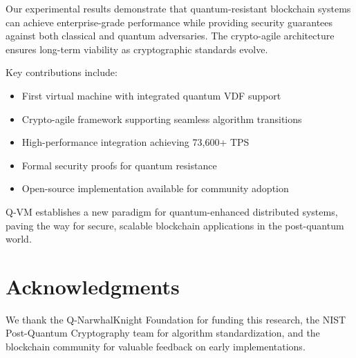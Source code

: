 \documentclass[11pt]{article}
\begin{document}
Our experimental results demonstrate that quantum-resistant blockchain systems can achieve enterprise-grade performance while providing security guarantees against both classical and quantum adversaries. The crypto-agile architecture ensures long-term viability as cryptographic standards evolve.

Key contributions include:

\begin{itemize}
    \item First virtual machine with integrated quantum VDF support
    \item Crypto-agile framework supporting seamless algorithm transitions
    \item High-performance integration achieving 73,600+ TPS
    \item Formal security proofs for quantum resistance
    \item Open-source implementation available for community adoption
\end{itemize}

Q-VM establishes a new paradigm for quantum-enhanced distributed systems, paving the way for secure, scalable blockchain applications in the post-quantum world.

\section*{Acknowledgments}

We thank the Q-NarwhalKnight Foundation for funding this research, the NIST Post-Quantum Cryptography team for algorithm standardization, and the blockchain community for valuable feedback on early implementations.
\end{document}
